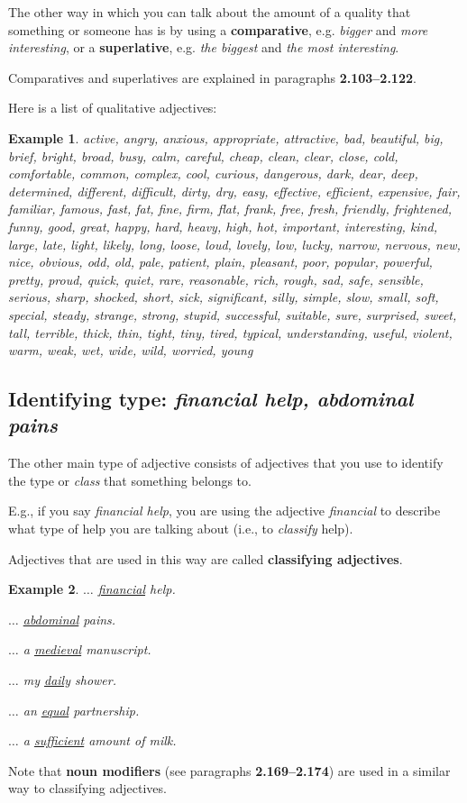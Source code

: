 \documentclass[oneside]{book}
\numberwithin{equation}{section}
\newtheorem{example}{Example}[section]
\begin{document}
%
\noindent{} The other way in which you can talk about the amount of a quality that something or someone has is by using a \textbf{comparative}, e.g. \textit{bigger} and \textit{more interesting}, or a \textbf{superlative}, e.g. \textit{the biggest} and \textit{the most interesting}.

Comparatives and superlatives are explained in paragraphs \textbf{2.103--2.122}.

%
Here is a list of qualitative adjectives:
\begin{example}
    active, angry, anxious, appropriate, attractive, bad, beautiful, big, brief, bright, broad, busy, calm, careful, cheap, clean, clear, close, cold, comfortable, common, complex, cool, curious, dangerous, dark, dear, deep, determined, different, difficult, dirty, dry, easy, effective, efficient, expensive, fair, familiar, famous, fast, fat, fine, firm, flat, frank, free, fresh, friendly, frightened, funny, good, great, happy, hard, heavy, high, hot, important, interesting, kind, large, late, light, likely, long, loose, loud, lovely, low, lucky, narrow, nervous, new, nice, obvious, odd, old, pale, patient, plain, pleasant, poor, popular, powerful, pretty, proud, quick, quiet, rare, reasonable, rich, rough, sad, safe, sensible, serious, sharp, shocked, short, sick, significant, silly, simple, slow, small, soft, special, steady, strange, strong, stupid, successful, suitable, sure, surprised, sweet, tall, terrible, thick, thin, tight, tiny, tired, typical, understanding, useful, violent, warm, weak, wet, wide, wild, worried, young
\end{example}

\subsection{Identifying type: \textit{financial help, abdominal pains}}
\noindent{} The other main type of adjective consists of adjectives that you use to identify the type or \textit{class} that something belongs to.

E.g., if you say \textit{financial help}, you are using the adjective \textit{financial} to describe what type of help you are talking about (i.e., to \textit{classify} help).

Adjectives that are used in this way are called \textbf{classifying adjectives}.
\begin{example}
    $\ldots$ \underline{financial} help.
    
    $\ldots$ \underline{abdominal} pains.
    
    $\ldots$ a \underline{medieval} manuscript.
    
    $\ldots$ my \underline{daily} shower.
    
    $\ldots$ an \underline{equal} partnership.
    
    $\ldots$ a \underline{sufficient} amount of milk.
\end{example}
Note that \textbf{noun modifiers} (see paragraphs \textbf{2.169--2.174}) are used in a similar way to classifying adjectives.
\end{document}
